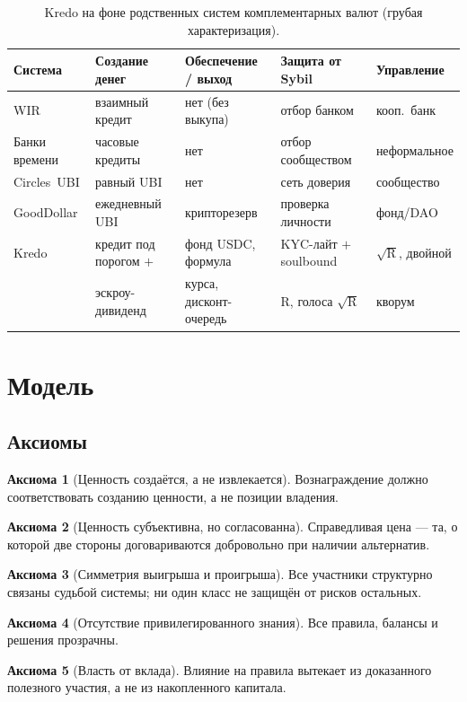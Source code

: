 \documentclass[11pt]{article}
\theoremstyle{plain}
\theoremstyle{definition}
\newtheorem{axiom}{Аксиома}
\theoremstyle{remark}
\newcommand{\R}{\mathrm{R}}
\begin{document}
\begin{table}[h]
\centering
\small
\begin{tabular}{@{}lllll@{}}
\toprule
Система & Создание денег & Обеспечение / выход & Защита от Sybil & Управление\\
\midrule
WIR \cite{stodder2009} & взаимный кредит & нет (без выкупа) & отбор банком & кооп.\ банк\\
Банки времени \cite{greco2009} & часовые кредиты & нет & отбор сообществом & неформальное\\
Circles~UBI \cite{circles2020} & равный UBI & нет & сеть доверия & сообщество\\
GoodDollar \cite{gooddollar2021} & ежедневный UBI & крипторезерв & проверка личности & фонд/DAO\\
\addlinespace
Kredo & кредит под порогом $+$ & фонд USDC, формула & KYC-лайт $+$ soulbound & $\sqrt{\R}$, двойной\\
      & эскроу-дивиденд & курса, дисконт-очередь & $\R$, голоса $\sqrt{\R}$ & кворум\\
\bottomrule
\end{tabular}
\caption{Kredo на фоне родственных систем комплементарных валют (грубая характеризация).}
\label{tab:related}
\end{table}

\section{Модель}

\subsection{Аксиомы}\label{sec:axioms}

\begin{axiom}[Ценность создаётся, а не извлекается]\label{ax:create}
Вознаграждение должно соответствовать созданию ценности, а не позиции владения.
\end{axiom}
\begin{axiom}[Ценность субъективна, но согласованна]\label{ax:price}
Справедливая цена --- та, о которой две стороны договариваются добровольно при наличии альтернатив.
\end{axiom}
\begin{axiom}[Симметрия выигрыша и проигрыша]\label{ax:symmetry}
Все участники структурно связаны судьбой системы; ни один класс не защищён от рисков остальных.
\end{axiom}
\begin{axiom}[Отсутствие привилегированного знания]\label{ax:transparency}
Все правила, балансы и решения прозрачны.
\end{axiom}
\begin{axiom}[Власть от вклада]\label{ax:power}
Влияние на правила вытекает из доказанного полезного участия, а не из накопленного капитала.
\end{axiom}
\end{document}
